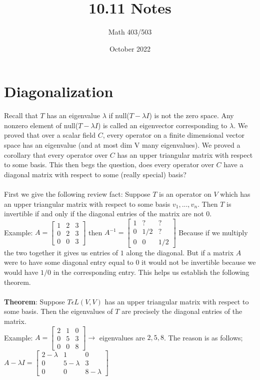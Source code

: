 \documentclass{article}
\title{10.11 Notes}
\author{Math 403/503 }
\date{October 2022}
\begin{document}
\maketitle

\section{Diagonalization}
Recall that $T$ has an eigenvalue $\lambda$ if null($T-\lambda I$) is not the zero space. Any nonzero element of null($T-\lambda I$) is called an eigenvector corresponding to $\lambda$. We proved that over a scalar field $C$, every operator on a finite dimensional vector space has an eigenvalue (and at most dim V many eigenvalues). We proved a corollary that every operator over $C$ has an upper triangular matrix with respect to some basis. This then begs the question, does every operator over $C$ have a diagonal matrix with respect to some (really special) basis? \\\\
First we give the following review fact: Suppose $T$ is an operator on $V$ which has an upper triangular matrix with respect to some basis $v_1,...,v_n$. Then $T$ is invertible if and only if the diagonal entries of the matrix are not $0$. \\
Example: $A = \begin{bmatrix} 1&2&3\\0&2&3\\0&0&3 \end{bmatrix}$ then $A^{-1} = \begin{bmatrix}
    1&?&?\\0&1/2&?\\0&0&1/2
\end{bmatrix}$
Because if we multiply the two together it gives us entries of $1$ along the diagonal. But if a matrix $A$ were to have some diagonal entry equal to $0$ it would not be invertible because we would have $1/0$ in the corresponding entry. This helps us establish the following theorem. \\\\
\textbf{Theorem}: Suppose $T \epsilon L(V,V)$ has an upper triangular matrix with respect to some basis. Then the eigenvalues of $T$ are precisely the diagonal entries of the matrix. \\
Example: $A = \begin{bmatrix}
    2&1&0\\0&5&3\\0&0&8
\end{bmatrix} \rightarrow$ eigenvalues are $2, 5, 8$. The reason is as follows; $A - \lambda I = \begin{bmatrix}
    2 - \lambda & 1&0\\ 0&5-\lambda & 3\\0&0&8-\lambda
\end{bmatrix}$
\end{document}
